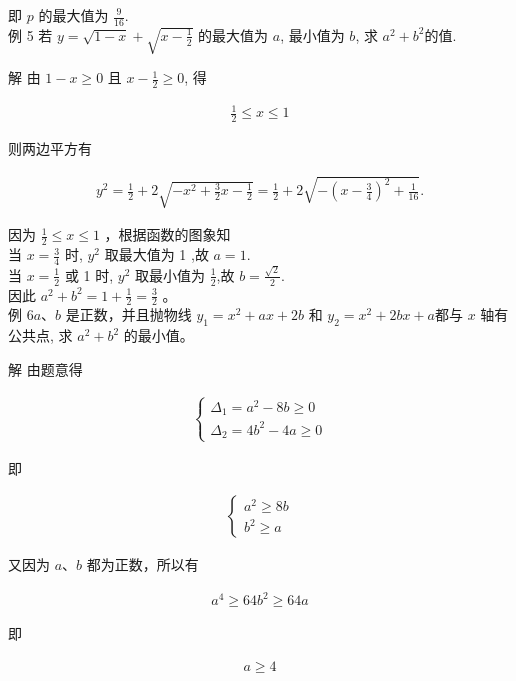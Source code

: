 \documentclass[10pt]{article}
\begin{document}
即 $p$ 的最大值为 $\frac{9}{16}$.\\
例 5 若 $y=\sqrt{1-x}+\sqrt{x-\frac{1}{2}}$ 的最大值为 $a$, 最小值为 $b$, 求 $a^{2}+b^{2}$的值.

解 由 $1-x \geqslant 0$ 且 $x-\frac{1}{2} \geqslant 0$, 得

\begin{align*}
\frac{1}{2} \leqslant x \leqslant 1
\end{align*}

则两边平方有

\begin{align*}
y^{2}=\frac{1}{2}+2 \sqrt{-x^{2}+\frac{3}{2} x-\frac{1}{2}}=\frac{1}{2}+2 \sqrt{-\left(x-\frac{3}{4}\right)^{2}+\frac{1}{16}} .
\end{align*}

因为 $\frac{1}{2} \leqslant x \leqslant 1$ ，根据函数的图象知\\
当 $x=\frac{3}{4}$ 时, $y^{2}$ 取最大值为 1 ,故 $a=1$.\\
当 $x=\frac{1}{2}$ 或 1 时, $y^{2}$ 取最小值为 $\frac{1}{2}$,故 $b=\frac{\sqrt{2}}{2}$.\\
因此 $a^{2}+b^{2}=1+\frac{1}{2}=\frac{3}{2}$ 。\\
例 $6 a 、 b$ 是正数，并且抛物线 $y_{1}=x^{2}+a x+2 b$ 和 $y_{2}=x^{2}+2 b x+a$都与 $x$ 轴有公共点, 求 $a^{2}+b^{2}$ 的最小值。

解 由题意得

\begin{align*}
\left\{\begin{array}{l}
\Delta_{1}=a^{2}-8 b \geqslant 0 \\
\Delta_{2}=4 b^{2}-4 a \geqslant 0
\end{array}\right.
\end{align*}

即

\begin{align*}
\left\{\begin{array}{l}
a^{2} \geqslant 8 b \\
b^{2} \geqslant a
\end{array}\right.
\end{align*}

又因为 $a 、 b$ 都为正数，所以有

\begin{align*}
a^{4} \geqslant 64 b^{2} \geqslant 64 a
\end{align*}

即

\begin{align*}
a \geqslant 4
\end{align*}
\end{document}
